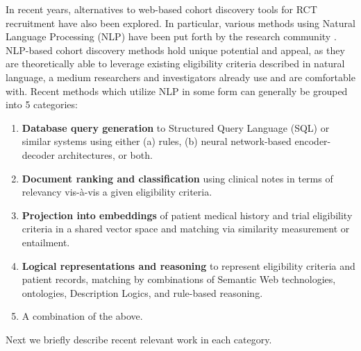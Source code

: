 \documentclass[../main.tex]{subfiles}
\begin{document}
\noindent In recent years, alternatives to web-based cohort discovery tools for RCT recruitment have also been explored. In particular, various methods using Natural Language Processing (NLP) have been put forth by the research community \cite{yuan2019criteria2query, soni2020patient, fang2022combining, zhang2020deepenroll, chen2019clinical, patrao2015recruit, dhayne2021emr2vec, liu2021evaluating, xiong2019cohort}. NLP-based cohort discovery methods hold unique potential and appeal, as they are theoretically able to leverage existing eligibility criteria described in natural language, a medium researchers and investigators already use and are comfortable with. Recent methods which utilize NLP in some form can generally be grouped into 5 categories:

\begin{enumerate}
    \item{\textbf{Database query generation} to Structured Query Language (SQL) or similar systems using either (a) rules, (b) neural network-based encoder-decoder architectures}, or both.
    \item{\textbf{Document ranking and classification} using clinical notes in terms of relevancy vis-à-vis a given eligibility criteria.}
    \item{\textbf{Projection into embeddings} of patient medical history and trial eligibility criteria in a shared vector space and matching via similarity measurement or entailment.}
    \item{\textbf{Logical representations and reasoning} to represent eligibility criteria and patient records, matching by combinations of Semantic Web technologies, ontologies, Description Logics, and rule-based reasoning.}
    \item{A combination of the above.}
\end{enumerate}

\noindent Next we briefly describe recent relevant work in each category. \\
\end{document}
